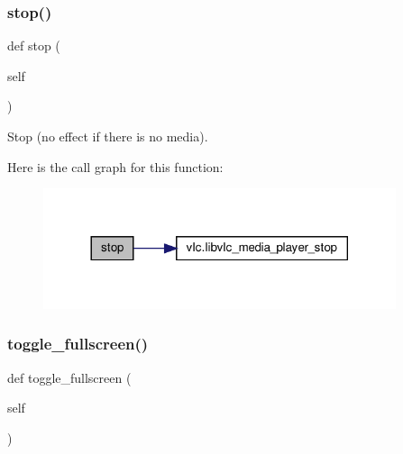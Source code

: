 \subsubsection{\texorpdfstring{stop()}{stop()}}
{\footnotesize\ttfamily def stop (\begin{DoxyParamCaption}\item[{}]{self }\end{DoxyParamCaption})}

\begin{DoxyVerb}Stop (no effect if there is no media).
\end{DoxyVerb}
 Here is the call graph for this function\+:
\nopagebreak
\begin{figure}[H]
\begin{center}
\leavevmode
\includegraphics[width=293pt]{classvlc_1_1_media_player_a26ca7c1c7fcdd35378e7be97727047a6_cgraph}
\end{center}
\end{figure}
\mbox{\label{classvlc_1_1_media_player_aadd20ddbe69aacc041317f017debc750}} 
\subsubsection{\texorpdfstring{toggle\+\_\+fullscreen()}{toggle\_fullscreen()}}
{\footnotesize\ttfamily def toggle\+\_\+fullscreen (\begin{DoxyParamCaption}\item[{}]{self }\end{DoxyParamCaption})}

